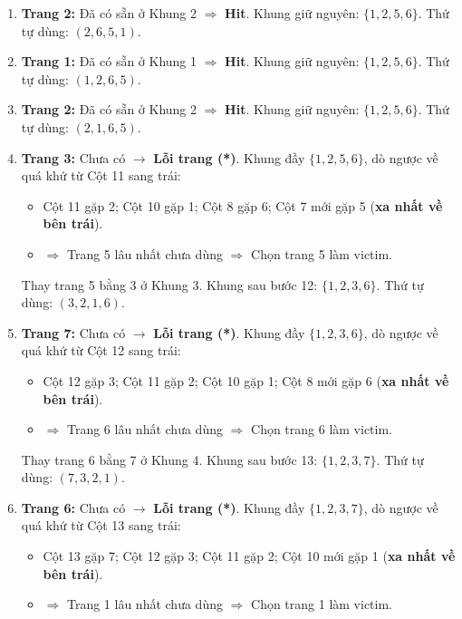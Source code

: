 \documentclass[11pt,a4paper]{article}
\begin{document}
\begin{enumerate}[label=\textbf{Cột \arabic*:}, leftmargin=*, itemsep=2pt]
\begin{itemize}[noitemsep]
    \end{itemize}
    Thay trang 4 bằng 6 ở Khung 4. Khung sau bước 8: $\{1, 2, 5, 6\}$. Thứ tự dùng: $(6, 5, 1, 2)$.
    \item \textbf{Trang 2:} Đã có sẵn ở Khung 2 $\Rightarrow$ \textbf{Hit}. Khung giữ nguyên: $\{1, 2, 5, 6\}$. Thứ tự dùng: $(2, 6, 5, 1)$.
    \item \textbf{Trang 1:} Đã có sẵn ở Khung 1 $\Rightarrow$ \textbf{Hit}. Khung giữ nguyên: $\{1, 2, 5, 6\}$. Thứ tự dùng: $(1, 2, 6, 5)$.
    \item \textbf{Trang 2:} Đã có sẵn ở Khung 2 $\Rightarrow$ \textbf{Hit}. Khung giữ nguyên: $\{1, 2, 5, 6\}$. Thứ tự dùng: $(2, 1, 6, 5)$.
    \item \textbf{Trang 3:} Chưa có $\rightarrow$ \textbf{Lỗi trang (*)}. Khung đầy $\{1, 2, 5, 6\}$, dò ngược về quá khứ từ Cột 11 sang trái:
    \begin{itemize}[noitemsep]
        \item Cột 11 gặp 2; Cột 10 gặp 1; Cột 8 gặp 6; Cột 7 mới gặp 5 (\textbf{xa nhất về bên trái}).
        \item $\Rightarrow$ Trang 5 lâu nhất chưa dùng $\Rightarrow$ Chọn trang 5 làm victim.
    \end{itemize}
    Thay trang 5 bằng 3 ở Khung 3. Khung sau bước 12: $\{1, 2, 3, 6\}$. Thứ tự dùng: $(3, 2, 1, 6)$.
    \item \textbf{Trang 7:} Chưa có $\rightarrow$ \textbf{Lỗi trang (*)}. Khung đầy $\{1, 2, 3, 6\}$, dò ngược về quá khứ từ Cột 12 sang trái:
    \begin{itemize}[noitemsep]
        \item Cột 12 gặp 3; Cột 11 gặp 2; Cột 10 gặp 1; Cột 8 mới gặp 6 (\textbf{xa nhất về bên trái}).
        \item $\Rightarrow$ Trang 6 lâu nhất chưa dùng $\Rightarrow$ Chọn trang 6 làm victim.
    \end{itemize}
    Thay trang 6 bằng 7 ở Khung 4. Khung sau bước 13: $\{1, 2, 3, 7\}$. Thứ tự dùng: $(7, 3, 2, 1)$.
    \item \textbf{Trang 6:} Chưa có $\rightarrow$ \textbf{Lỗi trang (*)}. Khung đầy $\{1, 2, 3, 7\}$, dò ngược về quá khứ từ Cột 13 sang trái:
    \begin{itemize}[noitemsep]
        \item Cột 13 gặp 7; Cột 12 gặp 3; Cột 11 gặp 2; Cột 10 mới gặp 1 (\textbf{xa nhất về bên trái}).
        \item $\Rightarrow$ Trang 1 lâu nhất chưa dùng $\Rightarrow$ Chọn trang 1 làm victim.

\end{itemize}
\end{enumerate}
\end{document}
